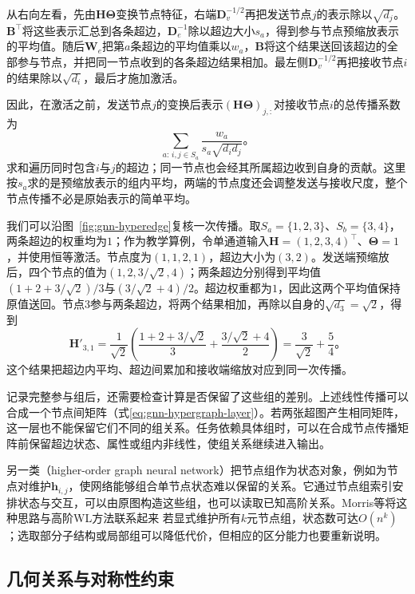 从右向左看，先由$\bm{H}\bm{\Theta}$变换节点特征，右端$\bm{D}_v^{-1/2}$再把发送节点$j$的表示除以$\sqrt{d_j}$。$\bm{B}^{\top}$将这些表示汇总到各条超边，$\bm{D}_e^{-1}$除以超边大小$s_a$，得到参与节点预缩放表示的平均值。随后$\bm{W}_e$把第$a$条超边的平均值乘以$w_a$，$\bm{B}$将这个结果送回该超边的全部参与节点，并把同一节点收到的各条超边结果相加。最左侧$\bm{D}_v^{-1/2}$再把接收节点$i$的结果除以$\sqrt{d_i}$，最后才施加激活。

因此，在激活之前，发送节点$j$的变换后表示$(\bm{H}\bm{\Theta})_{j,:}$对接收节点$i$的总传播系数为
\[
  \sum_{a:\,i,j\in S_a}\frac{w_a}{s_a\sqrt{d_i d_j}}\text{。}
\]
求和遍历同时包含$i$与$j$的超边；同一节点也会经其所属超边收到自身的贡献。这里按$s_a$求的是预缩放表示的组内平均，两端的节点度还会调整发送与接收尺度，整个节点传播不必是原始表示的简单平均。

我们可以沿图~\ref{fig:gnn-hyperedge}复核一次传播。取$S_a=\{1,2,3\}$、$S_b=\{3,4\}$，两条超边的权重均为$1$；作为教学算例，令单通道输入$\bm{H}=(1,2,3,4)^{\top}$、$\bm{\Theta}=1$，并使用恒等激活。节点度为$(1,1,2,1)$，超边大小为$(3,2)$。发送端预缩放后，四个节点的值为$(1,2,3/\sqrt{2},4)$；两条超边分别得到平均值$(1+2+3/\sqrt{2})/3$与$(3/\sqrt{2}+4)/2$。超边权重都为$1$，因此这两个平均值保持原值送回。节点3参与两条超边，将两个结果相加，再除以自身的$\sqrt{d_3}=\sqrt{2}$，得到
\[
  \bm{H}'_{3,1}
    =\frac{1}{\sqrt{2}}\left(
       \frac{1+2+3/\sqrt{2}}{3}
       +\frac{3/\sqrt{2}+4}{2}\right)
    =\frac{3}{\sqrt{2}}+\frac{5}{4}\text{。}
\]
这个结果把超边内平均、超边间累加和接收端缩放对应到同一次传播。

记录完整参与组后，还需要检查计算是否保留了这些组的差别。上述线性传播可以合成一个节点间矩阵（式\eqref{eq:gnn-hypergraph-layer}）。若两张超图产生相同矩阵，这一层也不能保留它们不同的组关系。任务依赖具体组时，可以在合成节点传播矩阵前保留超边状态、属性或组内非线性，使组关系继续进入输出。

另一类（higher-order graph neural network）把节点组作为状态对象，例如为节点对维护$\bm{h}_{i,j}$，使网络能够组合单节点状态难以保留的关系。它通过节点组索引安排状态与交互，可以由原图构造这些组，也可以读取已知高阶关系。Morris等将这种思路与高阶WL方法联系起来 若显式维护所有$k$元节点组，状态数可达$O(n^k)$；选取部分子结构或局部组可以降低代价，但相应的区分能力也要重新说明。

\subsection{几何关系与对称性约束}
\label{sec:gnn-geometric}

